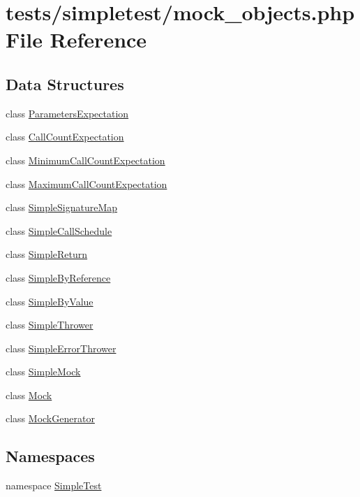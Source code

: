 \hypertarget{mock__objects_8php}{\section{tests/simpletest/mock\-\_\-objects.php File Reference}
\label{mock__objects_8php}
}
\subsection*{Data Structures}
\begin{DoxyCompactItemize}
\item 
class \hyperlink{class_parameters_expectation}{Parameters\-Expectation}
\item 
class \hyperlink{class_call_count_expectation}{Call\-Count\-Expectation}
\item 
class \hyperlink{class_minimum_call_count_expectation}{Minimum\-Call\-Count\-Expectation}
\item 
class \hyperlink{class_maximum_call_count_expectation}{Maximum\-Call\-Count\-Expectation}
\item 
class \hyperlink{class_simple_signature_map}{Simple\-Signature\-Map}
\item 
class \hyperlink{class_simple_call_schedule}{Simple\-Call\-Schedule}
\item 
class \hyperlink{class_simple_return}{Simple\-Return}
\item 
class \hyperlink{class_simple_by_reference}{Simple\-By\-Reference}
\item 
class \hyperlink{class_simple_by_value}{Simple\-By\-Value}
\item 
class \hyperlink{class_simple_thrower}{Simple\-Thrower}
\item 
class \hyperlink{class_simple_error_thrower}{Simple\-Error\-Thrower}
\item 
class \hyperlink{class_simple_mock}{Simple\-Mock}
\item 
class \hyperlink{class_mock}{Mock}
\item 
class \hyperlink{class_mock_generator}{Mock\-Generator}
\end{DoxyCompactItemize}
\subsection*{Namespaces}
\begin{DoxyCompactItemize}
\item 
namespace \hyperlink{namespace_simple_test}{Simple\-Test}
\end{DoxyCompactItemize}
